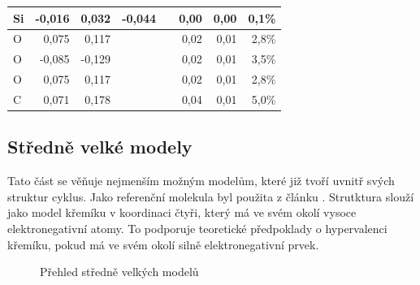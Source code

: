 \documentclass[
  digital, %
  table,   %
  lof,     %
  lot,     %
  oneside,
]{fithesis3}
\begin{document}
\begin{table}[htbp]
\begin{center}
\begin{tabular}{|l|r|r|l|l|r|r|r|}
Si & -0,016 & 0,032 & \multicolumn{1}{r|}{-0,044} &  & 0,00 & 0,00 & 0,1\% \\ \hline
O & 0,075 & 0,117 &  &  & 0,02 & 0,01 & 2,8\% \\ \hline
O & -0,085 & -0,129 &  &  & 0,02 & 0,01 & 3,5\% \\ \hline
O & 0,075 & 0,117 &  &  & 0,02 & 0,01 & 2,8\% \\ \hline
C & 0,071 & 0,178 &  &  & 0,04 & 0,01 & 5,0\% \\ \hline
\end{tabular}
\end{center}
\label{MPA_si_ch3_och3_4}
\end{table}

\subsection{Středně velké modely}
Tato část se věňuje nejmenším možným modelům, které již tvoří uvnitř svých struktur cyklus. Jako referenční molekula byl použita  z článku \cite{Chipanina2011}. Strutktura  slouží jako model křemíku v koordinaci čtyři, který má ve svém okolí vysoce elektronegativní atomy. To podporuje teoretické předpoklady o hypervalenci křemíku, pokud má ve svém okolí silně elektronegativní prvek.
\begin{figure}
\begin{center}
\caption{Přehled středně velkých modelů}
\label{prehled_middle}
\end{center}
\end{figure}
\end{document}
